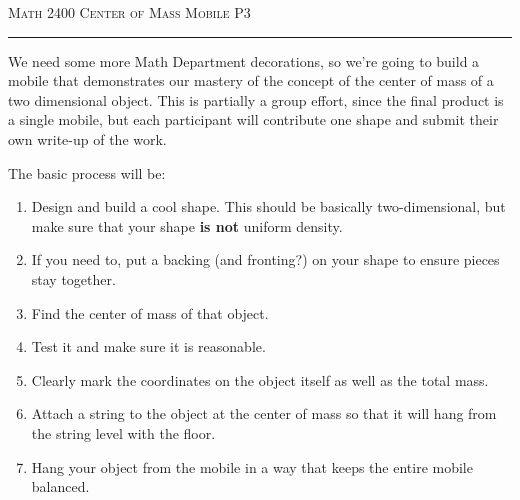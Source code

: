 \documentclass[12pt]{amsart}
\begin{document}
\thispagestyle{empty}

{\scshape Math 2400} \hfill {\scshape \large Center of Mass Mobile} \hfill {\scshape P3}
 
\smallskip

\hrule

\bigskip

We need some more Math Department decorations, so we're going to build a mobile that demonstrates our mastery of the concept of the center of mass of a two dimensional object.  This is partially a group effort, since the final product is a single mobile, but each participant will contribute one shape and submit their own write-up of the work.

\bigskip

\bigskip

The basic process will be:

\begin{enumerate}

\item  Design and build a cool shape.  This should be basically two-dimensional, but make sure that your shape {\bf is not} uniform density.

\medskip

\item  If you need to, put a backing (and fronting?) on your shape to ensure pieces stay together.

\medskip

\item  Find the center of mass of that object.

\medskip

\item  Test it and make sure it is reasonable.

\medskip

\item  Clearly mark the coordinates on the object itself as well as the total mass.

\medskip

\item  Attach a string to the object at the center of mass so that it will hang from the string level with the floor.

\medskip

\item  Hang your object from the mobile in a way that keeps the entire mobile balanced.

\medskip

\end{enumerate}
\end{document}
